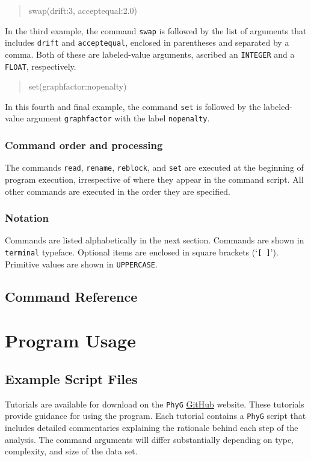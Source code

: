 \documentclass[11pt]{book}
\newcommand{\phyg}{\texttt{PhyG} }
\begin{document}
{{		\begin{quote}
		swap(drift:3, acceptequal:2.0)
		\end{quote}
				
		\noindent In the third example, the command \texttt{swap} is followed by the list 
		of arguments that includes \texttt{drift} and \texttt{acceptequal}, enclosed in 
		parentheses and separated by a comma. Both of these are labeled-value arguments, 
		ascribed an \texttt{INTEGER} and a \texttt{FLOAT}, respectively.
		
		\begin{quote}
		set(graphfactor:nopenalty) 
		\end{quote}
		
		\noindent In this fourth and final example, the command \texttt{set} is followed by the 
		labeled-value argument \texttt{graphfactor} with the label \texttt{nopenalty}.
				
	\subsection{Command order and processing}
		The commands \texttt{read}, \texttt{rename}, \texttt{reblock}, and \texttt{set} are 
		executed at the beginning of program execution, irrespective of where they appear 
		in the command script. All other commands are executed in the order they are specified. 
		
	\subsection{Notation}
		Commands are listed alphabetically in the next section. Commands are shown in 
		\texttt{terminal} typeface. Optional items are enclosed in square brackets (`\texttt{[ ]}').
		Primitive values are shown in \texttt{UPPERCASE}. 
	


\section{Command Reference}
	

\chapter{Program Usage}
\section{Example Script Files}
Tutorials are available for download on the \phyg \href{https://github.com/amnh/PhyGraph}{GitHub}
website. These tutorials provide guidance for using the program. Each tutorial contains a \phyg script 
that includes detailed commentaries explaining the rationale behind each step of the analysis. The 
command arguments will differ substantially depending on type, complexity, and size of the data set. 

}}
\end{document}
